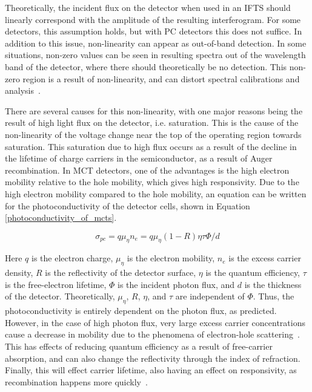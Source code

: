 Theoretically, the incident flux on the detector when used in an IFTS should linearly correspond with the amplitude of the resulting interferogram. For some detectors, this assumption holds, but with PC detectors this does not suffice. In addition to this issue, non-linearity can appear as out-of-band detection. In some situations, non-zero values can be seen in resulting spectra out of the wavelength band of the detector, where there should theoretically be no detection. This non-zero region is a result of non-linearity, and can distort spectral calibrations and analysis~\citep{prac_ex_corr_of_nonlinearity}.

There are several causes for this non-linearity, with one major reasons being the result of high light flux on the detector, i.e. saturation. This is the cause of the non-linearity of the voltage change near the top of the operating region towards saturation. This saturation due to high flux occurs as a result of the decline in the lifetime of charge carriers in the semiconductor, as a result of Auger recombination. In MCT detectors, one of the advantages is the high electron mobility relative to the hole mobility, which gives high responsivity. Due to the high electron mobility compared to the hole mobility, an equation can be written for the photoconductivity of the detector cells, shown in Equation \ref{photoconductivity_of_mcts}.

\begin{equation}\label{photoconductivity_of_mcts}
    \sigma_{pc} = q \mu_{\eta} n_e = q \mu_{\eta} (1-R)\eta \tau \Phi / d
\end{equation}

Here $q$ is the electron charge, $\mu_{\eta}$ is the electron mobility, $n_e$ is the excess carrier density, $R$ is the reflectivity of the detector surface, $\eta$ is the quantum efficiency, $\tau$ is the free-electron lifetime, $\Phi$ is the incident photon flux, and $d$ is the thickness of the detector. Theoretically, $\mu_{\eta}$, $R$, $\eta$, and $\tau$ are independent of $\Phi$. Thus, the photoconductivity is entirely dependent on the photon flux, as predicted. However, in the case of high photon flux, very large excess carrier concentrations cause a decrease in mobility due to the phenomena of electron-hole scattering~\citep{hole_mobility_MCTs}. This has effects of reducing quantum efficiency as a result of free-carrier absorption, and can also change the reflectivity through the index of refraction. Finally, this will effect carrier lifetime, also having an effect on responsivity, as recombination happens more quickly~\citep{auger-limited_carrier_lifetimes}.

